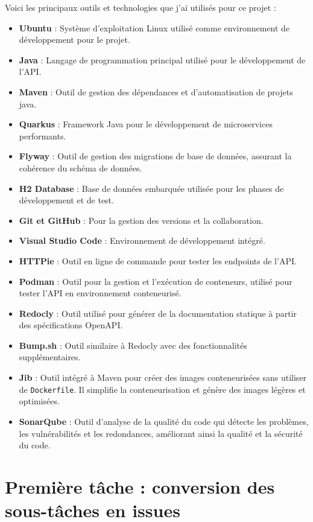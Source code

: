 \documentclass[11pt]{article}
\begin{document}
		Voici les principaux outils et technologies que j’ai utilisés pour ce projet :
	\begin{itemize}
		\item \textbf{Ubuntu} : Système d'exploitation Linux utilisé comme environnement de développement pour le projet.
		\item \textbf{Java} : Langage de programmation principal utilisé pour le développement de l'API.
		\item \textbf{Maven} : Outil de gestion des dépendances et d'automatisation de projets java.
		\item \textbf{Quarkus} : Framework Java pour le développement de microservices performants.
		\item \textbf{Flyway} : Outil de gestion des migrations de base de données, assurant la cohérence du schéma de données.
		\item \textbf{H2 Database} : Base de données embarquée utilisée pour les phases de développement et de test.
		\item \textbf{Git et GitHub} : Pour la gestion des versions et la collaboration.
		\item \textbf{Visual Studio Code} : Environnement de développement intégré.
		\item \textbf{HTTPie} : Outil en ligne de commande pour tester les endpoints de l'API.
		\item \textbf{Podman} : Outil pour la gestion et l'exécution de conteneurs, utilisé pour tester l'API en environnement conteneurisé.
		\item \textbf{Redocly} : Outil utilisé pour générer de la documentation statique à partir des spécifications OpenAPI.
		\item\textbf{Bump.sh} : Outil similaire à Redocly avec des fonctionnalités supplémentaires.
		\item \textbf{Jib} : Outil intégré à Maven pour créer des images conteneurisées sans utiliser de \texttt{Dockerfile}. Il simplifie la conteneurisation et génère des images légères et optimisées.
		\item \textbf{SonarQube} : Outil d'analyse de la qualité du code qui détecte les problèmes, les vulnérabilités et les redondances, améliorant ainsi la qualité et la sécurité du code.
	\end{itemize}
		
		\section{Première tâche : conversion des sous-tâches en issues}
		
\end{document}

